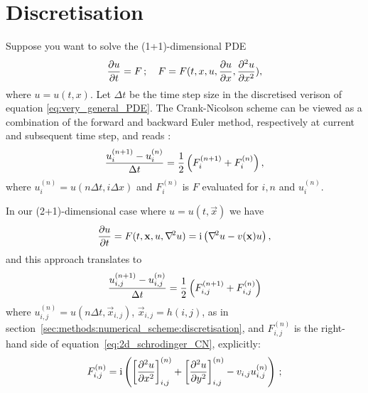 
\newpage
\appendix

\section{Discretisation}\label{app:discretisation}

Suppose you want to solve the (1+1)-dimensional PDE 
\begin{equation}\label{eq:very_general_PDE}
    \pdv{u}{t}=F\,;\quad F = F(t, x, u, \pdv{u}{x}, \pdv[2]{u}{x}),
\end{equation}
where $u=u(t,x)$. Let $\Delta t$ be the time step size in the discretised verison of equation \eqref{eq:very_general_PDE}. The Crank-Nicolson scheme can be viewed as a combination of the forward and backward Euler method, respectively at current and subsequent time step, and reads \citep{Crank-Nicolson}: 
\begin{equation}\label{eq:general_CN}
    \frac{u_i^{(n+1)}- u_{i}^{(n)} }{\Delta t} = \frac{1}{2} \left( F_i^{(n+1)}+F_i^{(n)} \right),
\end{equation}
where $u_i^{(n)} = u(n\Delta t, i\Delta x)$ and $F_i^{(n)}$ is $F$ evaluated for $i, n$ and $u_i^{(n)}$. 

In our (2+1)-dimensional case where $u= u(t, \vec{x})$ we have
\begin{align}\label{eq:2d_schrodinger_CN}
    \pdv{u}{t} = F(t, \mathbf{x}, u, \nabla^{\! 2}u)= \mathrm{i} \left( \nabla^{\! 2} u - v(\mathbf{x}) u \right),
\end{align}
and this approach translates to 
\begin{equation}\label{eq:2d_CN}
    \frac{u_{i,j}^{(n+1)}-u_{i,j}^{(n)}}{\Delta t} = \frac{1}{2} \left( F_{i,j}^{(n+1)} + F_{i,j}^{(n)} \right) 
\end{equation}
where $u_{i,j}^{(n)} = u(n\Delta t, \vec{x}_{i,j})$, $\vec{x}_{i,j}=h(i,j)$, as in section~\ref{sec:methods:numerical_scheme:discretisation}, and $F_{i,j}^{(n)}$ is the right-hand side of equation~\eqref{eq:2d_schrodinger_CN}, explicitly:
\begin{equation}
    F_{i, j}^{(n)} = \mathrm{i} \left(   \left[ \pdv[2]{u}{x} \right]_{i,j}^{(n)} + \left[ \pdv[2]{u}{y} \right]_{i,j}^{(n)} - v_{i,j}u_{i,j}^{(n)} \right) \, ;
\end{equation} 

